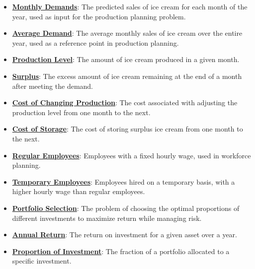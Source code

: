 \documentclass{article}%
\begin{document}
\begin{itemize}[leftmargin=*]%
\item \href{https://www.math.purdue.edu/~yipn/421/2024-10-28-ApplsLinProg.pdf#page=1}{\textbf{Monthly Demands}}: The predicted sales of ice cream for each month of the year, used as input for the production planning problem.%
\item \href{https://www.math.purdue.edu/~yipn/421/2024-10-28-ApplsLinProg.pdf#page=2}{\textbf{Average Demand}}: The average monthly sales of ice cream over the entire year, used as a reference point in production planning.%
\item \href{https://www.math.purdue.edu/~yipn/421/2024-10-28-ApplsLinProg.pdf#page=3}{\textbf{Production Level}}: The amount of ice cream produced in a given month.%
\item \href{https://www.math.purdue.edu/~yipn/421/2024-10-28-ApplsLinProg.pdf#page=3}{\textbf{Surplus}}: The excess amount of ice cream remaining at the end of a month after meeting the demand.%
\item \href{https://www.math.purdue.edu/~yipn/421/2024-10-28-ApplsLinProg.pdf#page=3}{\textbf{Cost of Changing Production}}: The cost associated with adjusting the production level from one month to the next.%
\item \href{https://www.math.purdue.edu/~yipn/421/2024-10-28-ApplsLinProg.pdf#page=3}{\textbf{Cost of Storage}}: The cost of storing surplus ice cream from one month to the next.%
\item \href{https://www.math.purdue.edu/~yipn/421/2024-10-28-ApplsLinProg.pdf#page=7}{\textbf{Regular Employees}}: Employees with a fixed hourly wage, used in workforce planning.%
\item \href{https://www.math.purdue.edu/~yipn/421/2024-10-28-ApplsLinProg.pdf#page=7}{\textbf{Temporary Employees}}: Employees hired on a temporary basis, with a higher hourly wage than regular employees.%
\item \href{https://www.math.purdue.edu/~yipn/421/2024-10-28-ApplsLinProg.pdf#page=9}{\textbf{Portfolio Selection}}: The problem of choosing the optimal proportions of different investments to maximize return while managing risk.%
\item \href{https://www.math.purdue.edu/~yipn/421/2024-10-28-ApplsLinProg.pdf#page=9}{\textbf{Annual Return}}: The return on investment for a given asset over a year.%
\item \href{https://www.math.purdue.edu/~yipn/421/2024-10-28-ApplsLinProg.pdf#page=9}{\textbf{Proportion of Investment}}: The fraction of a portfolio allocated to a specific investment.%

\end{itemize}
\end{document}
